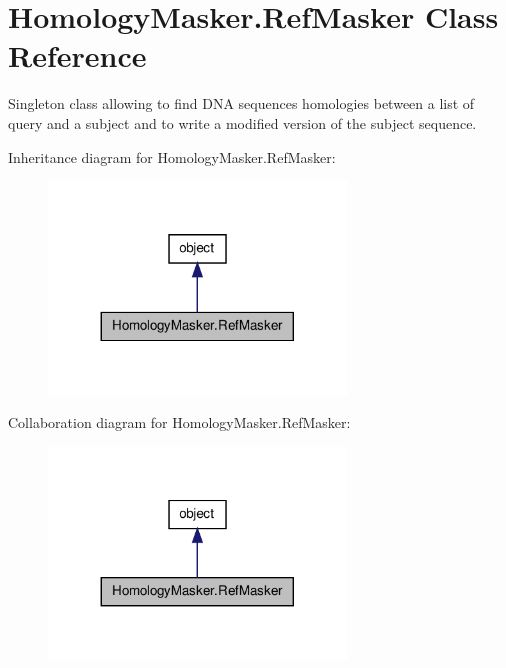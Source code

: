 \hypertarget{classHomologyMasker_1_1RefMasker}{\section{Homology\-Masker.\-Ref\-Masker Class Reference}
\label{classHomologyMasker_1_1RefMasker}
}


Singleton class allowing to find D\-N\-A sequences homologies between a list of query and a subject and to write a modified version of the subject sequence.  




Inheritance diagram for Homology\-Masker.\-Ref\-Masker\-:
\nopagebreak
\begin{figure}[H]
\begin{center}
\leavevmode
\includegraphics[width=224pt]{classHomologyMasker_1_1RefMasker__inherit__graph}
\end{center}
\end{figure}


Collaboration diagram for Homology\-Masker.\-Ref\-Masker\-:
\nopagebreak
\begin{figure}[H]
\begin{center}
\leavevmode
\includegraphics[width=224pt]{classHomologyMasker_1_1RefMasker__coll__graph}
\end{center}
\end{figure}


